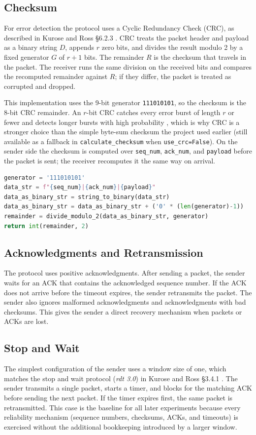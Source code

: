 \documentclass[conference]{IEEEtran}
\begin{document}
\subsection{Checksum}
For error detection the protocol uses a Cyclic Redundancy Check (CRC), as
described in Kurose and Ross \S6.2.3 \cite{b3}. CRC treats the packet header
and payload as a binary string $D$, appends $r$ zero bits, and divides the
result modulo 2 by a fixed generator $G$ of $r{+}1$ bits. The remainder $R$ is
the checksum that travels in the packet. The receiver runs the same division
on the received bits and compares the recomputed remainder against $R$; if
they differ, the packet is treated as corrupted and dropped.

This implementation uses the 9-bit generator \texttt{111010101}, so the
checksum is the 8-bit CRC remainder. An $r$-bit CRC catches every error burst
of length $r$ or fewer and detects longer bursts with high probability
\cite{b3}, which is why CRC is a stronger choice than the simple byte-sum
checksum the project used earlier (still available as a fallback in
\texttt{calculate\_checksum} when \texttt{use\_crc=False}). On the sender side
the checksum is computed over \texttt{seq\_num}, \texttt{ack\_num}, and
\texttt{payload} before the packet is sent; the receiver recomputes it the
same way on arrival.

\begin{lstlisting}[language=Python]
generator = '111010101'
data_str = f"{seq_num}|{ack_num}|{payload}"
data_as_binary_str = string_to_binary(data_str)
data_as_binary_str = data_as_binary_str + ('0' * (len(generator)-1))
remainder = divide_modulo_2(data_as_binary_str, generator)
return int(remainder, 2)
\end{lstlisting}

\subsection{Acknowledgments and Retransmission}
The protocol uses positive acknowledgments. After sending a packet, the sender
waits for an ACK that contains the acknowledged sequence number. If the ACK
does not arrive before the timeout expires, the sender retransmits the packet.
The sender also ignores malformed acknowledgments and acknowledgments with bad
checksums. This gives the sender a direct recovery mechanism when packets or
ACKs are lost.

\subsection{Stop and Wait}
The simplest configuration of the sender uses a window size of one, which
matches the stop and wait protocol (\textit{rdt 3.0}) in Kurose and Ross
\S3.4.1 \cite{b3}. The sender transmits a single packet, starts a timer, and
blocks for the matching ACK before sending the next packet. If the timer
expires first, the same packet is retransmitted. This case is the baseline for
all later experiments because every reliability mechanism (sequence numbers,
checksums, ACKs, and timeouts) is exercised without the additional bookkeeping
introduced by a larger window.
\end{document}
